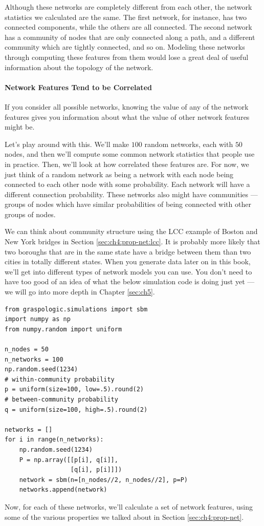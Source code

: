 Although these networks are completely different from each other, the network statistics we calculated are the same. The first network, for instance, has two connected components, while the others are all connected. The second network has a community of nodes that are only connected along a path, and a different community which are tightly connected, and so on. Modeling these networks through computing these features from them would lose a great deal of useful information about the topology of the network.


\paragraph*{Network Features Tend to be Correlated}
\label{sec:ch4:net-rep:featurelims}

If you consider all possible networks, knowing the value of any of the network features gives you information about what the value of other network features might be.

Let's play around with this. We'll make $100$ random networks, each with $50$ nodes, and then we'll compute some common network statistics that people use in practice. Then, we'll look at how correlated these features are. For now, we just think of a random network as being a network with each node being connected to each other node with some probability. Each network will have a different connection probability. These networks also might have communities --- groups of nodes which have similar probabilities of being connected with other groups of nodes. 

We can think about community structure using the LCC example of Boston and New York bridges in Section \ref{sec:ch4:prop-net:lcc}. It is probably more likely that two boroughs that are in the same state have a bridge between them than two cities in totally different states. When you generate data later on in this book, we'll get into different types of network models you can use. You don't need to have too good of an idea of what the below simulation code is doing just yet --- we will go into more depth in Chapter \ref{sec:ch5}.

\begin{lstlisting}[style=python]
from graspologic.simulations import sbm
import numpy as np
from numpy.random import uniform

n_nodes = 50
n_networks = 100
np.random.seed(1234)
# within-community probability
p = uniform(size=100, low=.5).round(2)
# between-community probability
q = uniform(size=100, high=.5).round(2)

networks = []
for i in range(n_networks):
    np.random.seed(1234)
    P = np.array([[p[i], q[i]],
                  [q[i], p[i]]])
    network = sbm(n=[n_nodes//2, n_nodes//2], p=P)
    networks.append(network)
\end{lstlisting}
Now, for each of these networks, we'll calculate a set of network features, using some of the various properties we talked about in Section \ref{sec:ch4:prop-net}.

